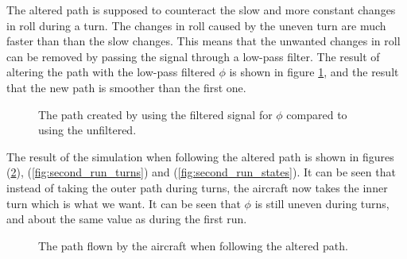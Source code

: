 The altered path is supposed to counteract the slow and more constant changes in roll during a turn. The changes in roll caused by the uneven turn are much faster than than the slow changes. This means that the unwanted changes in roll can be removed by passing the signal through a low-pass filter. The result of altering the path with the low-pass filtered $\phi$ is shown in figure \ref{fig:filtered_vs_unfiltered}, and the result that the new path is smoother than the first one.

\begin{figure}[]
    \centering
    \caption{The path created by using the filtered signal for $\phi$ compared to using the unfiltered.}
	\label{fig:filtered_vs_unfiltered}
\end{figure}

The result of the simulation when following the altered path is shown in figures (\ref{fig:second_run_path}), (\ref{fig:second_run_turns}) and (\ref{fig:second_run_states}). It can be seen that instead of taking the outer path during turns, the aircraft now takes the inner turn which is what we want. It can be seen that $\phi$ is still uneven during turns, and about the same value as during the first run.

\begin{figure}[]
    \centering
    \caption{The path flown by the aircraft when following the altered path.}
	\label{fig:second_run_path}
\end{figure}

